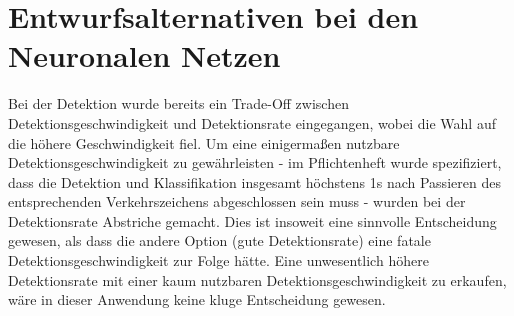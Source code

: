 \documentclass[12pt,a4paper,ngerman,enabledeprecatedfontcommands]{scrreprt}
\begin{document}
\section{Entwurfsalternativen bei den Neuronalen Netzen}
Bei der \gls{Detektion} wurde bereits ein Trade-Off zwischen Detektionsgeschwindigkeit und Detektionsrate eingegangen, wobei die Wahl auf die höhere Geschwindigkeit fiel. Um eine einigermaßen nutzbare Detektionsgeschwindigkeit zu gewährleisten - im Pflichtenheft wurde spezifiziert, dass die \gls{Detektion} und \gls{Klassifikation} insgesamt höchstens 1s nach Passieren des entsprechenden Verkehrszeichens abgeschlossen sein muss - wurden bei der Detektionsrate Abstriche gemacht. Dies ist insoweit eine sinnvolle Entscheidung gewesen, als dass die andere Option (gute Detektionsrate) eine fatale Detektionsgeschwindigkeit zur Folge hätte. Eine unwesentlich höhere Detektionsrate mit einer kaum nutzbaren Detektionsgeschwindigkeit zu erkaufen, wäre in dieser Anwendung keine kluge Entscheidung gewesen.\\





\end{document}
